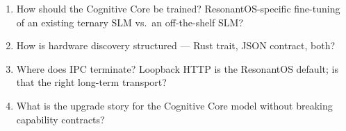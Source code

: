 \begin{enumerate}
  \item How should the Cognitive Core be trained? ResonantOS-specific
        fine-tuning of an existing ternary SLM vs.\ an off-the-shelf
        SLM?
  \item How is hardware discovery structured --- Rust trait, JSON
        contract, both?
  \item Where does IPC terminate? Loopback HTTP is the ResonantOS
        default; is that the right long-term transport?
  \item What is the upgrade story for the Cognitive Core model
        without breaking capability contracts?
\end{enumerate}
